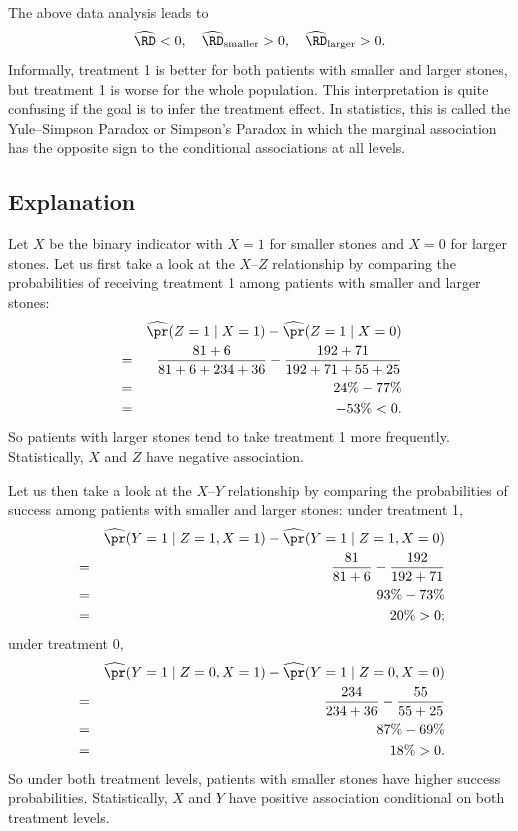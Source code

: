 The above data analysis leads to
$$
\widehat{\RD} < 0,\quad
\widehat{\RD}_\text{smaller} >0, \quad
\widehat{\RD}_\text{larger}  > 0 .
$$
Informally, treatment 1 is better for both patients with smaller and larger stones, but treatment 1 is worse for the whole population. This interpretation is quite confusing if the goal is to infer the treatment effect. In statistics, this is called the Yule--Simpson Paradox or Simpson's Paradox in which the marginal association has the opposite sign to the conditional associations at all levels. 




\subsection{Explanation}



Let $X$ be the binary indicator with $X=1$ for smaller stones and $X=0$ for larger stones. 
Let us first take a look at the $X$--$Z$ relationship by comparing the probabilities of receiving treatment 1 among patients with smaller and larger stones:
\begin{eqnarray*}
&& \widehat{\pr}(Z=1 \mid  X=1) - \widehat{\pr}(Z=1 \mid X=0) \\
&=& \frac{81 + 6}{81 + 6 + 234 + 36} - \frac{192+71}{192 + 71 + 55 + 25} \\
&=&  24\% - 77\% \\
&=& - 53\% < 0 .
\end{eqnarray*}
So patients with larger stones tend to take treatment 1 more frequently. Statistically, $X$ and $Z$ have negative association. 


Let us then take a look at the $X$--$Y$ relationship by comparing the probabilities of success among patients with smaller and larger stones: under treatment 1,
\begin{eqnarray*}
&& \widehat{\pr}(Y=1 \mid Z=1,  X=1) - \widehat{\pr}(Y=1 \mid Z=1,  X=0) \\
&=& \frac{81}{81 + 6} - \frac{192}{192 + 71} \\
&=& 93\% - 73\% \\
&=& 20\%
> 0;
\end{eqnarray*}
under treatment 0, 
\begin{eqnarray*}
&& \widehat{\pr}(Y=1 \mid Z=0, X=1) - \widehat{\pr}(Y=1 \mid Z=0,   X=0) \\
&=& \frac{234}{234 + 36} - \frac{55}{55 + 25} \\
&=& 87\% - 69\% \\
&=& 18\% 
> 0.
\end{eqnarray*}
So under both treatment levels, patients with smaller stones have higher success probabilities. Statistically, $X$ and $Y$ have positive association conditional on both treatment levels. 


